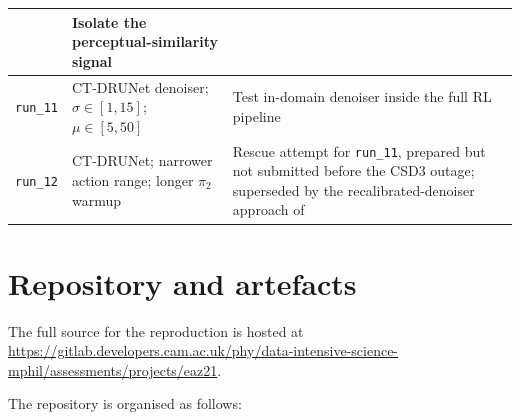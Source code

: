 \begin{table}[H]
\begin{tabular}{L{2.2cm}L{5.5cm}L{5.5cm}}
                        & Isolate the perceptual-similarity signal
                        \\ \hline
        \texttt{run\_11} & CT-DRUNet denoiser; $\sigma \in [1, 15]$; $\mu \in [5, 50]$
                        & Test in-domain denoiser inside the full RL pipeline
                        \\ \hline
        \texttt{run\_12} & CT-DRUNet; narrower action range; longer $\pi_2$ warmup
                        & Rescue attempt for \texttt{run\_11}, prepared but not submitted before the CSD3 outage; superseded by the recalibrated-denoiser approach of~
                        \\
        \bottomrule
    \end{tabular}
\end{table}

\section{Repository and artefacts}
\label{sec:repo}

The full source for the reproduction is hosted at \url{https://gitlab.developers.cam.ac.uk/phy/data-intensive-science-mphil/assessments/projects/eaz21}.

The repository is organised as follows: 

